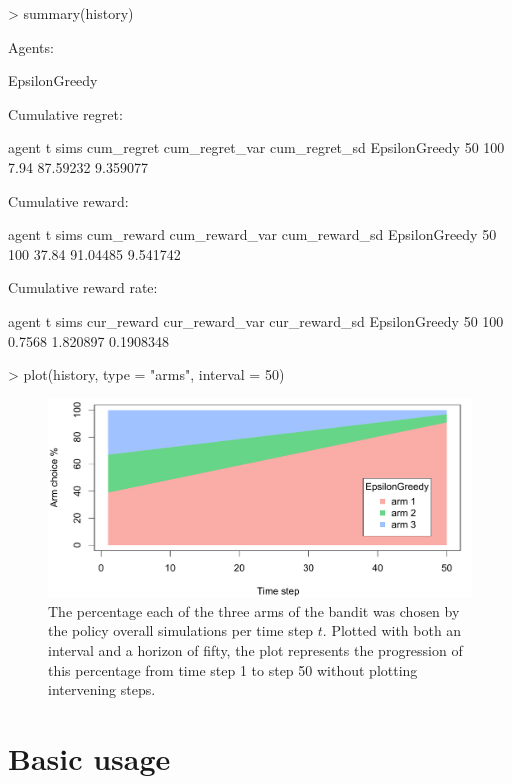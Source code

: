 \documentclass{jss}
\begin{document}
\begin{CodeChunk}
\begin{CodeInput}
> summary(history)
\end{CodeInput}
\begin{CodeOutput}
Agents:

  EpsilonGreedy

Cumulative regret:

         agent  t sims cum_regret cum_regret_var cum_regret_sd
 EpsilonGreedy 50  100       7.94       87.59232      9.359077


Cumulative reward:

         agent  t sims cum_reward cum_reward_var cum_reward_sd
 EpsilonGreedy 50  100      37.84       91.04485      9.541742


Cumulative reward rate:

         agent  t sims cur_reward cur_reward_var cur_reward_sd
 EpsilonGreedy 50  100     0.7568       1.820897     0.1908348
\end{CodeOutput}
\end{CodeChunk}

\begin{CodeChunk}
\begin{CodeInput}
> plot(history, type = "arms", interval = 50)
\end{CodeInput}
\end{CodeChunk}
\begin{figure}[H]
\centering
\includegraphics[width=.99\textwidth]{fig/section_2_3}
\caption{The percentage each of the three arms of the bandit was chosen by the policy overall simulations per time step $t$. Plotted with both an interval and a horizon of fifty, the plot represents the progression of this percentage from time step 1 to step 50 without plotting intervening steps.}
\label{fig:section_2_3}
\end{figure}


\section{Basic usage} \label{basicusage}
\end{document}
